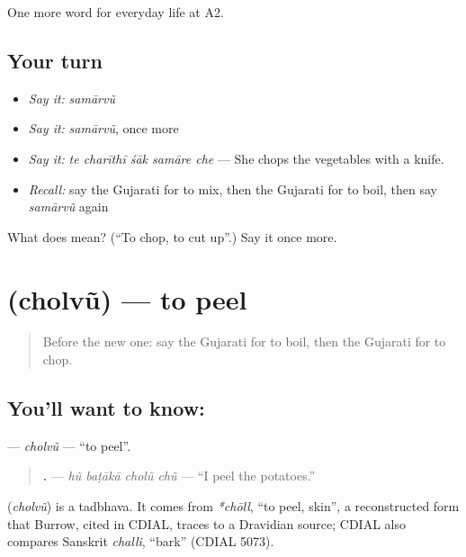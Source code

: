 \begin{grammarlens}[title={What you've built}]
One more word for everyday life at A2.
\end{grammarlens}

\subsection*{Your turn}
\begin{itemize}
\raggedright
  \item \emph{Say it:} \emph{samārvũ}
  \item \emph{Say it:} \emph{samārvũ}, once more
  \item \emph{Say it:} \emph{te charīthī śāk samāre che} — She chops the vegetables with a knife.
  \item \emph{Recall:} say the Gujarati for to mix, then the Gujarati for to boil, then say \emph{samārvũ} again
\end{itemize}

\begin{tcolorbox}[breakable,colback=teal!4,colframe=teal!35!black,title={Before you move on}]
What does  mean? (\textquotedblleft{}To chop, to cut up\textquotedblright{}.) Say it once more.
\end{tcolorbox}
\section[\texorpdfstring{\gu{છોલવું} (cholvũ)}{છોલવું (cholvũ)}]{ (cholvũ) — to peel}

\label{lesson:GU-C166-cholvu}



\begin{quote}
Before the new one: say the Gujarati for to boil, then the Gujarati for to chop.
\end{quote}

\subsection*{You'll want to know: }
\textbf{} — \emph{cholvũ} — \textquotedblleft{}to peel\textquotedblright{}.

\begin{quote}
\textbf{   .} — \emph{hũ baṭākā cholũ chũ} — \textquotedblleft{}I peel the potatoes.\textquotedblright{}
\end{quote}

\begin{cousinweb}
\textbf{} (\emph{cholvũ}) is a tadbhava. It comes from \emph{*chōll}, \textquotedblleft{}to peel, skin\textquotedblright{}, a reconstructed form that Burrow, cited in CDIAL, traces to a Dravidian source; CDIAL also compares Sanskrit \emph{challi}, \textquotedblleft{}bark\textquotedblright{} (CDIAL 5073).
\end{cousinweb}

